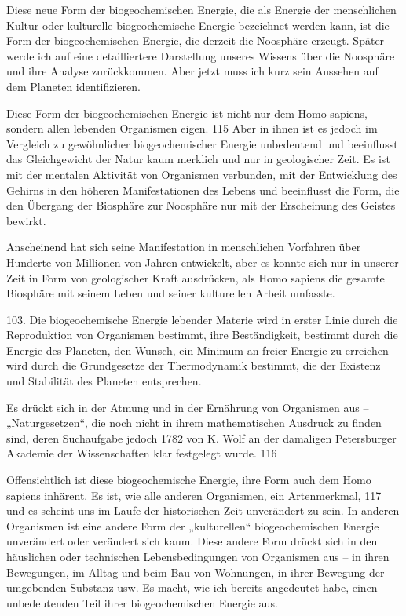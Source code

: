 \documentclass[11pt,a4paper]{book}
\begin{document}
Diese neue Form der biogeochemischen Energie, die als Energie der menschlichen Kultur oder kulturelle biogeochemische Energie bezeichnet werden kann, ist die Form der biogeochemischen Energie, die derzeit die Noosphäre erzeugt. Später werde ich auf eine detailliertere Darstellung unseres Wissens über die Noosphäre und ihre Analyse zurückkommen. Aber jetzt muss ich kurz sein Aussehen auf dem Planeten identifizieren.



Diese Form der biogeochemischen Energie ist nicht nur dem Homo sapiens, sondern allen lebenden Organismen eigen. 115 Aber in ihnen ist es jedoch im Vergleich zu gewöhnlicher biogeochemischer Energie unbedeutend und beeinflusst das Gleichgewicht der Natur kaum merklich und nur in geologischer Zeit. Es ist mit der mentalen Aktivität von Organismen verbunden, mit der Entwicklung des Gehirns in den höheren Manifestationen des Lebens und beeinflusst die Form, die den Übergang der Biosphäre zur Noosphäre nur mit der Erscheinung des Geistes bewirkt.



Anscheinend hat sich seine Manifestation in menschlichen Vorfahren über Hunderte von Millionen von Jahren entwickelt, aber es konnte sich nur in unserer Zeit in Form von geologischer Kraft ausdrücken, als Homo sapiens die gesamte Biosphäre mit seinem Leben und seiner kulturellen Arbeit umfasste.



103. Die biogeochemische Energie lebender Materie wird in erster Linie durch die Reproduktion von Organismen bestimmt, ihre Beständigkeit, bestimmt durch die Energie des Planeten, den Wunsch, ein Minimum an freier Energie zu erreichen -- wird durch die Grundgesetze der Thermodynamik bestimmt, die der Existenz und Stabilität des Planeten entsprechen.



Es drückt sich in der Atmung und in der Ernährung von Organismen aus -- „Naturgesetzen“, die noch nicht in ihrem mathematischen Ausdruck zu finden sind, deren Suchaufgabe jedoch 1782 von K. Wolf an der damaligen Petersburger Akademie der Wissenschaften klar festgelegt wurde. 116



Offensichtlich ist diese biogeochemische Energie, ihre Form auch dem Homo sapiens inhärent. Es ist, wie alle anderen Organismen, ein Artenmerkmal, 117 und es scheint uns im Laufe der historischen Zeit unverändert zu sein. In anderen Organismen ist eine andere Form der „kulturellen“ biogeochemischen Energie unverändert oder verändert sich kaum. Diese andere Form drückt sich in den häuslichen oder technischen Lebensbedingungen von Organismen aus -- in ihren Bewegungen, im Alltag und beim Bau von Wohnungen, in ihrer Bewegung der umgebenden Substanz usw. Es macht, wie ich bereits angedeutet habe, einen unbedeutenden Teil ihrer biogeochemischen Energie aus.
\end{document}
